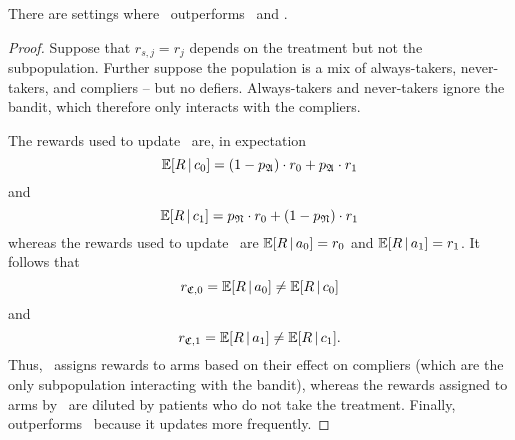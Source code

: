 \begin{prop}\label{prop:actual}
	There are settings where \actual\, outperforms \chosen\, and \comply.
\end{prop}
\begin{proof}
	Suppose that $r_{s,j}=r_j$ depends on the treatment but not the subpopulation. Further suppose the population is a mix of always-takers, never-takers, and compliers -- but no defiers. 
	Always-takers and never-takers ignore the bandit, which therefore only interacts with the compliers. 

	The rewards used to update \chosen\, are, in expectation 
	\begin{equation}
		\operatorname*{\mathbb E}[R\,|\,c_0] 
		= (1-p_{\mathfrak A})\cdot r_0 + p_{\mathfrak A}\cdot r_1
	\end{equation} and 
	\begin{equation}
		\operatorname*{\mathbb E}[R\,|\,c_1]
		= p_{\mathfrak N}\cdot r_0 + (1-p_{\mathfrak N})\cdot r_1
	\end{equation}
	whereas the rewards used to update \actual\, are $\operatorname*{\mathbb E}[R\,|\,a_0] = r_0$ and $\operatorname*{\mathbb E}[R\,|\,a_1] = r_1$.
	It follows that
	\begin{equation}
		r_{{\mathfrak C},0} = \operatorname*{\mathbb E}[R\,|\,a_0] \neq \operatorname*{\mathbb E}[R\,|\,c_0] 
	\end{equation} and 
	\begin{equation}
		r_{{\mathfrak C},1} = \operatorname*{\mathbb E}[R\,|\,a_1] \neq \operatorname*{\mathbb E}[R\,|\,c_1].
	\end{equation}
	Thus, \actual\, assigns rewards to arms based on their effect on compliers (which are the only subpopulation interacting with the bandit), whereas the rewards assigned to arms by \chosen\, are diluted by patients who do not take the treatment. Finally, \actual\, outperforms \comply\, because it updates more frequently.
\end{proof}

